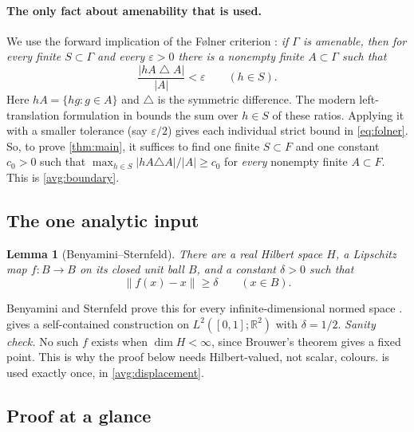 \documentclass[11pt]{article}
\newcommand{\R}{\mathbb R}
\newcommand{\norm}[1]{\lVert #1\rVert}
\newtheorem{lemma}[theorem]{Lemma}
\theoremstyle{definition}
\numberwithin{equation}{section}
\begin{document}
\paragraph{The only fact about amenability that is used.}
We use the forward implication of the F\o lner criterion
\cite{Folner1955}: \emph{if \(\Gamma\) is amenable, then for every finite
\(S\subset \Gamma\) and every \(\varepsilon>0\) there is a nonempty finite
\(A\subset \Gamma\) such that}
\begin{equation}\label{eq:folner}
  \frac{|hA\mathbin{\triangle}A|}{|A|}<\varepsilon
  \qquad(h\in S).
\end{equation}
Here \(hA=\{hg:g\in A\}\) and \(\triangle\) is the symmetric difference.
The modern left-translation formulation in
\cite[Theorem~1.2]{Moore2013} bounds the sum over \(h\in S\) of these
ratios. Applying it with a smaller tolerance (say \(\varepsilon/2\)) gives
each individual strict bound in \eqref{eq:folner}.
So, to prove \cref{thm:main}, it suffices to find one finite
\(S\subset F\) and one constant \(c_0>0\) such that
\(\max_{h\in S}|hA\triangle A|/|A|\ge c_0\) for \emph{every} nonempty
finite \(A\subset F\). This is \cref{avg:boundary}.

\subsection{The one analytic input}

\begin{lemma}[Benyamini--Sternfeld]\label{lem:displacement}
There are a real Hilbert space \(H\), a Lipschitz map \(f:B\to B\) on its
closed unit ball \(B\), and a constant \(\delta>0\) such that
\[
  \norm{f(x)-x}\ge\delta\qquad(x\in B).
\]
\end{lemma}

Benyamini and Sternfeld prove this for every infinite-dimensional
normed space \cite[Theorem, part~(3), p.~439]{BenyaminiSternfeld1983}.
 gives a self-contained construction on
\(L^2([0,1];\R^2)\) with \(\delta=1/2\).
\emph{Sanity check.} No such \(f\) exists when \(\dim H<\infty\), since
Brouwer's theorem gives a fixed point. This is why the proof below needs
Hilbert-valued, not scalar, colours.
 is used exactly once, in
\eqref{avg:displacement}.

\subsection{Proof at a glance}\label{sec:glance}
\end{document}
